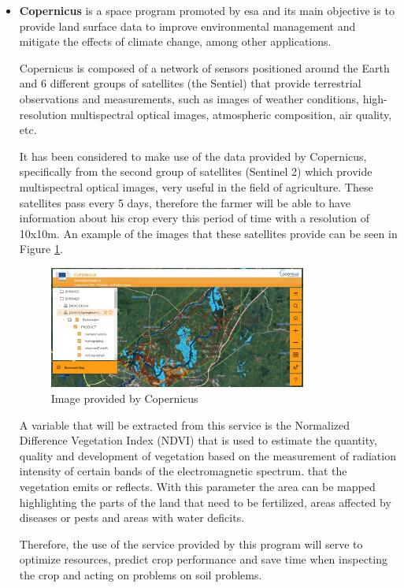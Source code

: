 \begin{itemize}
    \item \textbf{Copernicus} is a space program promoted by \gls{esa} and its main objective is to provide land surface data to improve environmental management and mitigate the effects of climate change, among other applications.
    
    Copernicus is composed of a network of sensors positioned around the Earth and 6 different groups of satellites (the Sentiel) that provide terrestrial observations and measurements, such as images of weather conditions, high-resolution multispectral optical images, atmospheric composition, air quality, etc.
    
    It has been considered to make use of the data provided by Copernicus, specifically from the second group of satellites (Sentinel 2) which provide multispectral optical images, very useful in the field of agriculture. These satellites pass every 5 days, therefore the farmer will be able to have information about his crop every this period of time with a resolution of 10x10m. An example of the images that these satellites provide can be seen in Figure \ref{fig:copernicus}.
    
    \begin{figure}
        \centering
        \includegraphics[width=0.8\textwidth]{images/copernicus.jpeg}
        \caption{Image provided by Copernicus}
        \label{fig:copernicus}
    \end{figure} 
    
    A variable that will be extracted from this service is the Normalized Difference Vegetation Index (NDVI) that is used to estimate the quantity, quality and development of vegetation based on the measurement of radiation intensity of certain bands of the electromagnetic spectrum. that the vegetation emits or reflects. With this parameter the area can be mapped highlighting the parts of the land that need to be fertilized, areas affected by diseases or pests and areas with water deficits.
    
    Therefore, the use of the service provided by this program will serve to optimize resources, predict crop performance and save time when inspecting the crop and acting on problems on soil problems.
    
\end{itemize}
